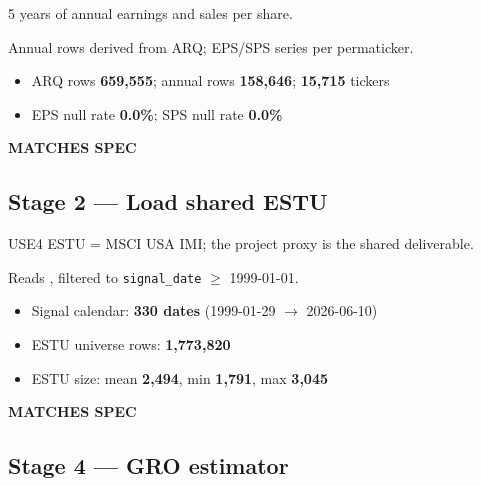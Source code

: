 \documentclass[11pt,a4paper]{article}
\newcommand{\PASS}[1]{\textcolor{pass}{\textbf{#1}}}
\begin{document}
\begin{description}[style=nextline]
  \item[PDF SPEC] 5 years of annual earnings and sales per share.
  \item[Implementation] Annual rows derived from ARQ; EPS/SPS series per permaticker.
  \item[Observed]\phantom{x}
    \begin{itemize}[nosep, topsep=-\parskip]
      \item ARQ rows \textbf{659{,}555}; annual rows \textbf{158{,}646}; \textbf{15{,}715} tickers
      \item EPS null rate \textbf{0.0\%}; SPS null rate \textbf{0.0\%}
    \end{itemize}
  \item[Status] \PASS{MATCHES SPEC}
\end{description}

\subsection{Stage 2 --- Load shared ESTU}

\begin{description}[style=nextline]
  \item[PDF SPEC] USE4 ESTU = MSCI USA IMI; the project proxy is the shared  deliverable.
  \item[Implementation] Reads , filtered to \texttt{signal\_date} $\geq$ 1999-01-01.
  \item[Observed]\phantom{x}
    \begin{itemize}[nosep, topsep=-\parskip]
      \item Signal calendar: \textbf{330 dates} (1999-01-29 $\to$ 2026-06-10)
      \item ESTU universe rows: \textbf{1{,}773{,}820}
      \item ESTU size: mean \textbf{2{,}494}, min \textbf{1{,}791}, max \textbf{3{,}045}
    \end{itemize}
  \item[Status] \PASS{MATCHES SPEC}
\end{description}

\subsection{Stage 4 --- GRO estimator}
\end{document}
